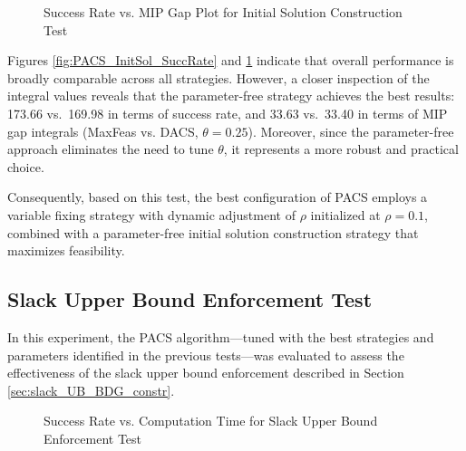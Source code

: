 \begin{figure}[H]
    \centering
    \begin{minipage}{0.6\columnwidth}
        \centering
        \resizebox{\linewidth}{!}{}
    \end{minipage}%
    \hfill
    \begin{minipage}{0.4\columnwidth}
        \centering
        \resizebox{\linewidth}{!}{}
    \end{minipage}
    \caption{Success Rate vs. MIP Gap Plot for Initial Solution Construction Test}
    \label{fig:PACS_InitSol_MGAP}
\end{figure}
Figures \ref{fig:PACS_InitSol_SuccRate} and \ref{fig:PACS_InitSol_MGAP} indicate that overall performance is broadly comparable across all strategies. However, a closer inspection of the integral values reveals that the parameter-free strategy achieves the best results: 173.66 vs.\ 169.98 in terms of success rate, and 33.63 vs.\ 33.40 in terms of MIP gap integrals (MaxFeas vs. DACS, $\theta=0.25$). Moreover, since the parameter-free approach eliminates the need to tune $\theta$, it represents a more robust and practical choice.

Consequently, based on this test, the best configuration of PACS employs a variable fixing strategy with dynamic adjustment of $\rho$ initialized at $\rho = 0.1$, combined with a parameter-free initial solution construction strategy that maximizes feasibility.

\subsection{Slack Upper Bound Enforcement Test}\label{sec:test_slack_UB}
In this experiment, the PACS algorithm—tuned with the best strategies and parameters identified in the previous tests—was evaluated to assess the effectiveness of the slack upper bound enforcement described in Section \ref{sec:slack_UB_BDG_constr}.

\begin{figure}[H]
\centering
\begin{minipage}{0.6\columnwidth}
\centering
\resizebox{\linewidth}{!}{}
\end{minipage}%
\hfill
\begin{minipage}{0.4\columnwidth}
\centering
\resizebox{\linewidth}{!}{}
\end{minipage}
\caption{Success Rate vs. Computation Time for Slack Upper Bound Enforcement Test}
\label{fig:PACS_FixSlack_SuccRate}
\end{figure}


